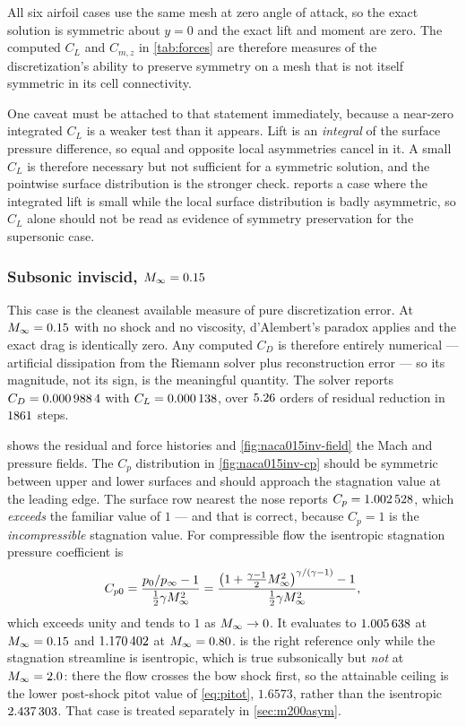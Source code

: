 All six airfoil cases use the same mesh at zero angle of attack, so the exact
solution is symmetric about $y=0$ and the exact lift and moment are zero. The
computed $C_L$ and $C_{m,z}$ in \cref{tab:forces} are therefore measures of the
discretization's ability to preserve symmetry on a mesh that is not itself
symmetric in its cell connectivity.

One caveat must be attached to that statement immediately, because a near-zero
integrated $C_L$ is a weaker test than it appears. Lift is an \emph{integral} of the
surface pressure difference, so equal and opposite local asymmetries cancel in it. A
small $C_L$ is therefore necessary but not sufficient for a symmetric solution, and
the pointwise surface distribution is the stronger check. 
reports a case where the integrated lift is small while the local surface
distribution is badly asymmetric, so $C_L$ alone should not be read as evidence of
symmetry preservation for the supersonic case.

\subsubsection{Subsonic inviscid, $M_\infty=0.15$}

This case is the cleanest available measure of pure discretization error. At
$M_\infty=0.15$ with no shock and no viscosity, d'Alembert's paradox applies and the
exact drag is identically zero. Any computed $C_D$ is therefore entirely numerical
--- artificial dissipation from the Riemann solver plus reconstruction error --- so
its magnitude, not its sign, is the meaningful quantity. The solver reports
$C_D=\num{0.0009884}$ with $C_L=\num{0.000138}$, over
$\num{5.26}$ orders of residual reduction in $\num{1861}$
steps.

 shows the residual and force histories and
\cref{fig:naca015inv-field} the Mach and pressure fields. The $C_p$ distribution
in \cref{fig:naca015inv-cp} should be symmetric between upper and lower surfaces
and should approach the stagnation value at the leading edge. The surface row nearest
the nose reports $C_p=\num{1.002528}$, which \emph{exceeds} the familiar value of
$1$ --- and that is correct, because $C_p=1$ is the \emph{incompressible} stagnation
value. For compressible flow the isentropic stagnation pressure coefficient is
\begin{equation}
  C_{p0}=\frac{p_0/p_\infty-1}{\tfrac12\gamma M_\infty^2}
  =\frac{\left(1+\tfrac{\gamma-1}{2}M_\infty^2\right)^{\gamma/(\gamma-1)}-1}
         {\tfrac12\gamma M_\infty^2},
  \label{eq:stagcp}
\end{equation}
which exceeds unity and tends to $1$ as $M_\infty\to0$. It evaluates to
$\num{1.005638}$ at $M_\infty=0.15$ and $\num{1.170402}$ at $M_\infty=0.80$.
 is the right reference only while the stagnation streamline is isentropic,
which is true subsonically but \emph{not} at $M_\infty=2.0$: there the flow crosses the bow
shock first, so the attainable ceiling is the lower post-shock pitot value of
\cref{eq:pitot}, $1.6573$, rather than the isentropic $\num{2.437303}$. That case is
treated separately in \cref{sec:m200asym}.

